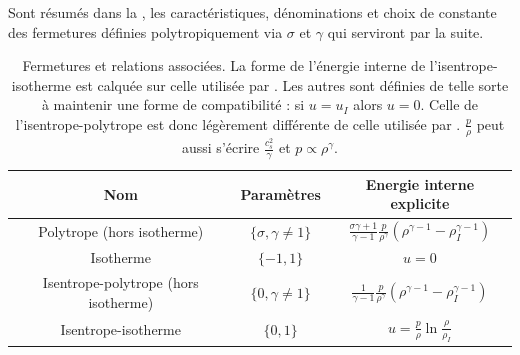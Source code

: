 Sont résumés dans la , les caractéristiques, dénominations et choix de constante des fermetures définies polytropiquement via $\sigma$ et $\gamma$ qui serviront par la suite. 
\begin{table}[!ht]
\begin{center}
\begin{tabular}{ c|c|c } 
Nom & Paramètres & Energie interne explicite\\
\hline
Polytrope (hors isotherme)  & $\{\sigma,\gamma \neq 1 \}$  & $ \frac{\sigma \gamma+1 }{\gamma-1} \frac{p}{\rho^{\gamma}} \left(\rho^{\gamma-1} - \rho_I^{\gamma-1}\right) $    \\
Isotherme  & $\{-1,1\}$ & $  u = 0$     \\
Isentrope-polytrope (hors isotherme) & $\{0,\gamma \neq 1\}$ & $ \frac{1 }{\gamma-1} \frac{p}{\rho^{\gamma}} \left(\rho^{\gamma-1} - \rho_I^{\gamma-1}\right)  $  \\
Isentrope-isotherme & $\{0,1\}$  & $ u = \frac{p}{\rho} \ln \frac{\rho}{\rho_I}$  \\
\end{tabular}
\end{center}
\caption{Fermetures et relations associées. La forme de l'énergie interne de l'isentrope-isotherme est calquée sur celle utilisée par \cite{galtier_exact_2011}. Les autres sont définies de telle sorte à maintenir une forme de compatibilité : si $u = u_I$ alors $u = 0$. Celle de l'isentrope-polytrope est donc légèrement différente de celle utilisée par \cite{banerjee_kolmogorov-like_2014}. $\frac{p}{\rho}$ peut aussi s'écrire $\frac{c_s^2}{\gamma}$ et $p \propto \rho^{\gamma}$. \label{tab:fermetures}}
\end{table}

